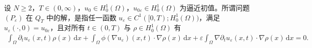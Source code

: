\documentclass[../../main.tex]{subfiles}%
\begin{document}
\begin{definition}\label{definition:ch08-正则化解N2}
设 $N\geqslant2$，$T\in(0,\infty)$，$u_0\in H^1_0(\Omega)$，$u_{0\varepsilon}\in H^1_0(\Omega)$ 为逼近初值。所谓问题 $(P_\varepsilon)$ 在 $Q_T$ 中的解，是指任一函数 $u_\varepsilon\in C^1([0,T);H^1_0(\Omega))$，满足 $u_\varepsilon(\cdot,0)=u_{0\varepsilon}$，且对所有 $t\in(0,T)$ 与 $\rho\in H^1_0(\Omega)$ 有
\begin{align}
\int_\Omega\partial_t u_\varepsilon(x,t)\rho(x)\,\mathrm{d}x
+\int_\Omega\phi(\nabla u_\varepsilon)(x,t)\cdot\nabla\rho(x)\,\mathrm{d}x
+\varepsilon\int_\Omega\nabla\partial_t u_\varepsilon(x,t)\cdot\nabla\rho(x)\,\mathrm{d}x=0. \label{align:ch08-8.11}
\end{align}
\end{definition}
\end{document}

